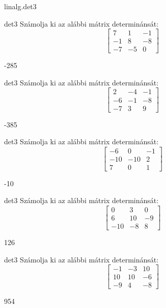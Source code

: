 \documentclass[12pt]{article}
\begin{document}
\begin{quiz}{linalg.det3}
\begin{numerical}{det3}
Számolja ki az alábbi mátrix determinánsát:
$$\left[\begin{array}{ccc}7& 1& -1\\ -1& 8& -8\\ -7& -5& 0\end{array}\right]$$

\item -285
\end{numerical}


\begin{numerical}{det3}
Számolja ki az alábbi mátrix determinánsát:
$$\left[\begin{array}{ccc}2& -4& -1\\ -6& -1& -8\\ -7& 3& 9\end{array}\right]$$

\item -385
\end{numerical}


\begin{numerical}{det3}
Számolja ki az alábbi mátrix determinánsát:
$$\left[\begin{array}{ccc}-6& 0& -1\\ -10& -10& 2\\ 7& 0& 1\end{array}\right]$$

\item -10
\end{numerical}


\begin{numerical}{det3}
Számolja ki az alábbi mátrix determinánsát:
$$\left[\begin{array}{ccc}0& 3& 0\\ 6& 10& -9\\ -10& -8& 8\end{array}\right]$$

\item 126
\end{numerical}


\begin{numerical}{det3}
Számolja ki az alábbi mátrix determinánsát:
$$\left[\begin{array}{ccc}-1& -3& 10\\ 10& 10& -6\\ -9& 4& -8\end{array}\right]$$

\item 954
\end{numerical}



\end{quiz}
\end{document}
